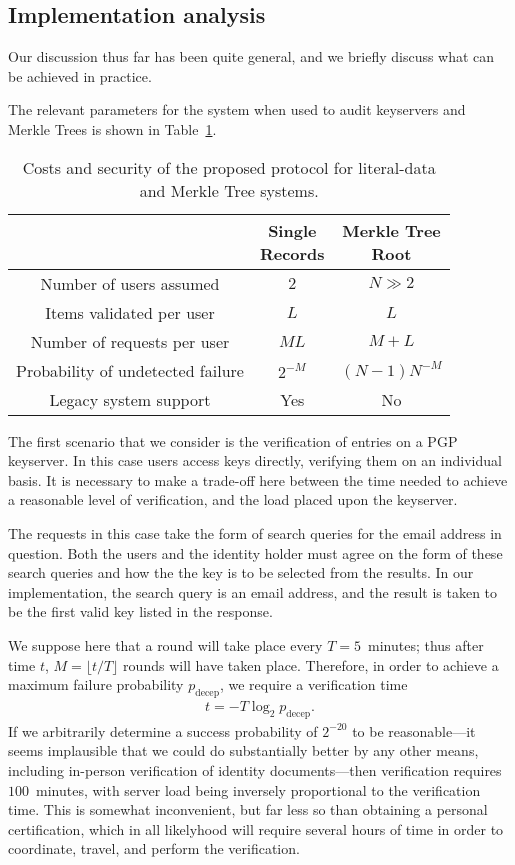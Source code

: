 \documentclass[USenglish]{llncs}
\begin{document}
\subsection{Implementation analysis}
Our discussion thus far has been quite general, and we briefly discuss what
can be achieved in practice.

The relevant parameters for the system when used to audit keyservers and
Merkle Trees is shown in Table~\ref{tbl:results}.
\begin{table}[t]
	\renewcommand{\arraystretch}{1.4}
	\centering
	\begin{tabular}{c | c c}
		\hline
		&\shortstack{Single\\Records} & \shortstack{Merkle Tree \\Root} \\
		\hline
		Number of users assumed & $2$ & $N \gg 2$\\
		\hline
		Items validated per user & $L$ & $L$ \\
		\hline
		Number of requests per user & $ML$ & $M+L$ \\
		\hline
		Probability of undetected failure & $2^{-M}$ & $(N-1)N^{-M}$ \\
		\hline
		Legacy system support & Yes & No \\
		\hline
	\end{tabular}
	\caption{Costs and security of the proposed protocol for
			literal-data and Merkle Tree systems.}\label{tbl:results}
\end{table}

The first scenario that we consider is the verification of entries on a
PGP keyserver.  In this case users access keys directly, verifying them
on an individual basis.  It is necessary to make a trade-off here between
the time needed to achieve a reasonable level of verification, and
the load placed upon the keyserver.

The requests in this case take the form of search queries for the
email address in question.  Both the users and the identity holder must
agree on the form of these search queries and how the the key is to be
selected from the results.  In our implementation, the search query is
an email address, and the result is taken to be the first valid key listed in
the response.

We suppose here that a round will take place every $T = 5$~minutes; thus
after time $t$, $M = \lfloor t/T\rfloor$ rounds will have taken place.
Therefore, in order to achieve a maximum failure probability $p_\text{decep}$, we
require a verification time
\begin{align*}
	t = - T \log_2 p_\text{decep} .
\end{align*}
If we arbitrarily determine a success probability of $2^{-20}$ to be
reasonable---it seems implausible that we could do substantially better
by any other means, including in-person verification of identity
documents---then verification requires $100$~minutes,
with server load being inversely proportional to the verification
time.  This is somewhat inconvenient, but far less so than
obtaining a personal certification, which in all likelyhood will
require several hours of time in order to coordinate, travel,
and perform the verification.
\end{document}
